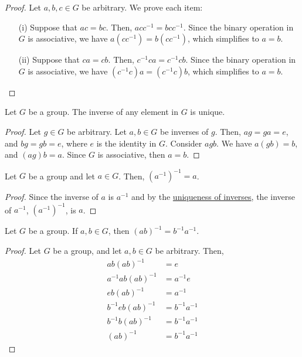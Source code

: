     \begin{proof}
        Let \(a, b, c\in G\) be arbitrary. We prove each item:
        \begin{enumerate}
            \item[(i)] Suppose that \(ac = bc\). Then, \(acc^{-1} = bcc^{-1}\). Since the binary operation in \(G\) is associative, we have \(a(cc^{-1}) = b(cc^{-1})\), which simplifies to \(a = b\).

            \item[(ii)] Suppose that \(ca = cb\). Then, \(c^{-1}ca = c^{-1}cb\). Since the binary operation in \(G\) is associative, we have \((c^{-1}c)a = (c^{-1}c)b\), which simplifies to \(a = b\).
        \end{enumerate}
    \end{proof}

    \begin{thm}
        Let \(G\) be a group. The inverse of any element in \(G\) is unique.
    \end{thm}

    \begin{proof}
        Let \(g\in G\) be arbitrary. Let \(a, b\in G\) be inverses of \(g\). Then, \(ag = ga = e\), and \(bg = gb = e\), where \(e\) is the identity in \(G\). Consider \(agb\). We have \(a(gb) = b\), and \((ag)b = a\). Since \(G\) is associative, then \(a = b\).
    \end{proof}

    \begin{thm}
        Let \(G\) be a group and let \(a \in G\). Then, \((a^{-1})^{-1} = a\).
    \end{thm}

    \begin{proof}
        Since the inverse of \(a\) is \(a^{-1}\) and by the \hyperref[thm:unique-inverse]{uniqueness of inverses}, the inverse of \(a^{-1}\), \((a^{-1})^{-1}\), is \(a\).
    \end{proof}

    \begin{thm}
        Let \(G\) be a group. If \(a, b\in G\), then \((ab)^{-1} = b^{-1}a^{-1}\).
    \end{thm}

    \begin{proof}
        Let \(G\) be a group, and let \(a,b\in G\) be arbitrary. Then,
        \begin{align*}
            ab(ab)^{-1} &= e \\
            a^{-1}ab(ab)^{-1} &= a^{-1}e \\
            eb(ab)^{-1} &= a^{-1} \\
            b^{-1}eb(ab)^{-1} &= b^{-1}a^{-1} \\
            b^{-1}b(ab)^{-1} &= b^{-1}a^{-1} \\
            (ab)^{-1} &= b^{-1}a^{-1}
        \end{align*}
    \end{proof}

